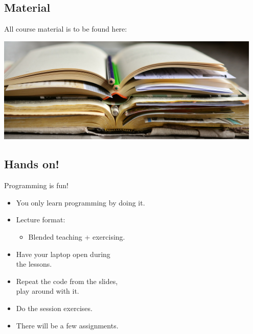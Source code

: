 \documentclass[aspectratio=1610,slidestop]{beamer}
\begin{document}
\subsection{Material}
\begin{pframe}
 All course material is to be found here:\\

 \begin{center}
   \includegraphics[width=0.95\textwidth]{../../images/books.jpg}
 \end{center}
\end{pframe}

\subsection{Hands on!}
\begin{pframe}
 Programming is fun!
 \begin{itemize}
  \item You only learn programming by doing it.
  \item Lecture format:
  \begin{itemize}
   \item Blended teaching + exercising.
  \end{itemize}
  \item Have your laptop open during\\
  the lessons.
  \item Repeat the code from the slides,\\
  play around with it.
  \item Do the session exercises.
  \item There will be a few assignments.
 \end{itemize}
\end{pframe}
\end{document}
